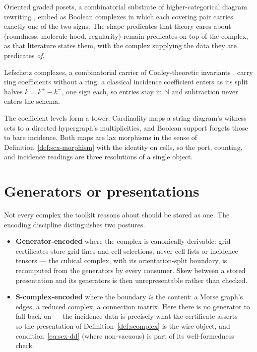 \begin{remark}
\label{rem:scx-ogp}
Oriented graded posets, a combinatorial substrate of
higher-categorical diagram rewriting \cite{hadzihasanovic24a}, embed
as Boolean complexes in which each covering pair carries exactly one
of the two signs. The shape predicates that theory cares about
(roundness, molecule-hood, regularity) remain predicates on top of
the complex, as that literature states them, with the complex
supplying the data they are predicates \emph{of}.
\end{remark}

\begin{remark}
\label{rem:scx-lefschetz}
Lefschetz complexes, a combinatorial carrier of Conley-theoretic
invariants \cite{mischaikowmrozek2002}, carry ring coefficients
without a ring: a classical incidence coefficient enters as its
split halves $k = k^{+} - k^{-}$, one sign each, so entries stay in
$\mathbb{N}$ and subtraction never enters the schema.
\end{remark}

\begin{remark}
\label{rem:scx-tower}
The coefficient levels form a tower. Cardinality maps a string
diagram's witness sets to a directed hypergraph's multiplicities, and
Boolean support forgets those to bare incidence. Both maps are lax
morphisms in the sense of Definition~\ref{def:scx-morphism} with the
identity on cells, so the port, counting, and incidence readings are
three resolutions of a single object.
\end{remark}

\section{Generators or presentations}
\label{sec:scx-generators}

Not every complex the toolkit reasons about should be stored as one.
The encoding discipline distinguishes two postures.

\begin{itemize}
\item \textbf{Generator-encoded} where the complex is canonically
  derivable: grid certificates store grid lines and cell selections,
  never cell lists or incidence tensors --- the cubical complex, with
  its orientation-split boundary, is recomputed from the generators
  by every consumer. Skew between a stored presentation and its
  generators is then unrepresentable rather than checked.
\item \textbf{S-complex-encoded} where the boundary \emph{is} the
  content: a Morse graph's edges, a reduced complex, a connection
  matrix. Here there is no generator to fall back on --- the
  incidence data is precisely what the certificate asserts --- so the
  presentation of Definition~\ref{def:scomplex} is the wire object,
  and condition~\eqref{eq:scx-dd} (where non-vacuous) is part of its
  well-formedness check.
\end{itemize}


